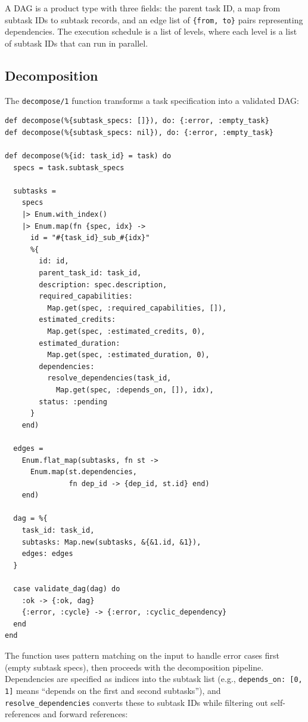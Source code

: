 \documentclass[12pt,a4paper]{article}
\theoremstyle{plain}
\theoremstyle{definition}
\begin{document}
A DAG is a product type with three fields: the parent task ID, a map from subtask IDs to subtask records, and an edge list of \texttt{\{from, to\}} pairs representing dependencies. The execution schedule is a list of levels, where each level is a list of subtask IDs that can run in parallel.

\subsection{Decomposition}

The \texttt{decompose/1} function transforms a task specification into a validated DAG:

\begin{lstlisting}[caption={Task decomposition into a DAG},label={lst:decomp-main}]
def decompose(%{subtask_specs: []}), do: {:error, :empty_task}
def decompose(%{subtask_specs: nil}), do: {:error, :empty_task}

def decompose(%{id: task_id} = task) do
  specs = task.subtask_specs

  subtasks =
    specs
    |> Enum.with_index()
    |> Enum.map(fn {spec, idx} ->
      id = "#{task_id}_sub_#{idx}"
      %{
        id: id,
        parent_task_id: task_id,
        description: spec.description,
        required_capabilities:
          Map.get(spec, :required_capabilities, []),
        estimated_credits:
          Map.get(spec, :estimated_credits, 0),
        estimated_duration:
          Map.get(spec, :estimated_duration, 0),
        dependencies:
          resolve_dependencies(task_id,
            Map.get(spec, :depends_on, []), idx),
        status: :pending
      }
    end)

  edges =
    Enum.flat_map(subtasks, fn st ->
      Enum.map(st.dependencies,
               fn dep_id -> {dep_id, st.id} end)
    end)

  dag = %{
    task_id: task_id,
    subtasks: Map.new(subtasks, &{&1.id, &1}),
    edges: edges
  }

  case validate_dag(dag) do
    :ok -> {:ok, dag}
    {:error, :cycle} -> {:error, :cyclic_dependency}
  end
end
\end{lstlisting}

The function uses pattern matching on the input to handle error cases first (empty subtask specs), then proceeds with the decomposition pipeline. Dependencies are specified as indices into the subtask list (e.g., \texttt{depends\_on: [0, 1]} means ``depends on the first and second subtasks''), and \texttt{resolve\_dependencies} converts these to subtask IDs while filtering out self-references and forward references:
\end{document}
